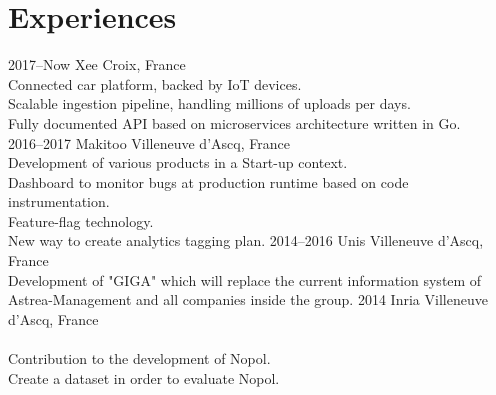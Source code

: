 \documentclass[hidelinks]{cv-style}          %
\begin{document}
\section{Experiences}
\begin{entrylist}
\entry
  {2017--Now}
  {Xee}
  {Croix, France}
  {\\
  Connected car platform, backed by IoT devices.\\
  Scalable ingestion pipeline, handling millions of uploads per days.\\  
  Fully documented API based on microservices architecture written in Go.\\
}
\entry
  {2016--2017}
  {Makitoo}
  {Villeneuve d'Ascq, France}
  {\\
  Development of various products in a Start-up context.\\
  Dashboard to monitor bugs at production runtime based on code instrumentation.\\
  Feature-flag technology.\\
  New way to create analytics tagging plan.
}
\entry
  {2014--2016}
  {Unis}
  {Villeneuve d'Ascq, France}
  {\\
  Development of "GIGA" which will replace the current information system of Astrea-Management and all companies inside the group.
}
\entry
  {2014}
  {Inria}
  {Villeneuve d'Ascq, France}
  {\\
  \\
  Contribution to the development of Nopol.\\
  Create a dataset in order to evaluate Nopol.
}


{\vspace{-1.0cm}}
\end{entrylist}
\leavevmode

\end{document}
